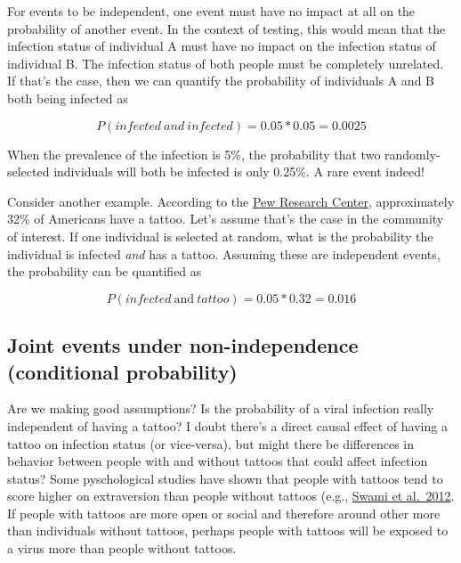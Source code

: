 \documentclass[
]{book}
\begin{document}
For events to be independent, one event must have no impact at all on the probability of another event. In the context of testing, this would mean that the infection status of individual A must have no impact on the infection status of individual B. The infection status of both people must be completely unrelated. If that's the case, then we can quantify the probability of individuals A and B both being infected as

\[
P(infected\ and\ infected) = 0.05*0.05=0.0025
\]

When the prevalence of the infection is 5\%, the probability that two randomly-selected individuals will both be infected is only 0.25\%. A rare event indeed!

Consider another example. According to the \href{https://www.pewresearch.org/short-reads/2023/08/15/32-of-americans-have-a-tattoo-including-22-who-have-more-than-one}{Pew Research Center}, approximately 32\% of Americans have a tattoo. Let's assume that's the case in the community of interest. If one individual is selected at random, what is the probability the individual is infected \emph{and} has a tattoo. Assuming these are independent events, the probability can be quantified as

\[
P(infected\ \text{and}\ tattoo) = 0.05*0.32=0.016
\]

\subsection{Joint events under non-independence (conditional probability)}\label{joint-events-under-non-independence-conditional-probability}

Are we making good assumptions? Is the probability of a viral infection really independent of having a tattoo? I doubt there's a direct causal effect of having a tattoo on infection status (or vice-versa), but might there be differences in behavior between people with and without tattoos that could affect infection status? Some pyschological studies have shown that people with tattoos tend to score higher on extraversion than people without tattoos (e.g., \href{https://journals.sagepub.com/doi/abs/10.2466/09.07.21.PR0.111.4.97-106?casa_token=GG6UgmonrdAAAAAA:REJHZeVgnjOn2KVpShnrxHf-9M5QSt-TMPkMgliduw_ZaGClESfJkRM3hYkIlXz5xaWDgCp6B_Nr}{Swami et al.~2012}. If people with tattoos are more open or social and therefore around other more than individuals without tattoos, perhaps people with tattoos will be exposed to a virus more than people without tattoos.
\end{document}
